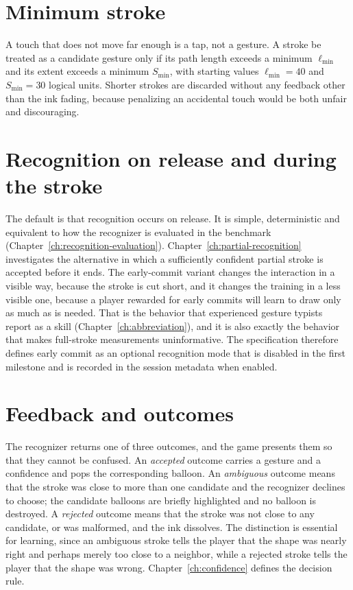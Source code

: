 \section{Minimum stroke}

A touch that does not move far enough is a tap, not a gesture. A stroke \must{} be treated as a candidate gesture only if its path length exceeds a minimum $\ell_{\min}$ and its extent exceeds a minimum $S_{\min}$, with starting values $\ell_{\min}=40$ and $S_{\min}=30$ logical units.\evS{} Shorter strokes are discarded without any feedback other than the ink fading, because penalizing an accidental touch would be both unfair and discouraging.

\section{Recognition on release and during the stroke}

The default is that recognition occurs on release. It is simple, deterministic and equivalent to how the recognizer is evaluated in the benchmark (Chapter~\ref{ch:recognition-evaluation}). Chapter~\ref{ch:partial-recognition} investigates the alternative in which a sufficiently confident partial stroke is accepted before it ends. The early-commit variant changes the interaction in a visible way, because the stroke is cut short, and it changes the training in a less visible one, because a player rewarded for early commits will learn to draw only as much as is needed. That is the behavior that experienced gesture typists report as a skill (Chapter~\ref{ch:abbreviation}), and it is also exactly the behavior that makes full-stroke measurements uninformative. The specification therefore defines early commit as an optional recognition mode that is disabled in the first milestone and is recorded in the session metadata when enabled.

\section{Feedback and outcomes}

The recognizer returns one of three outcomes, and the game presents them so that they cannot be confused. An \emph{accepted} outcome carries a gesture and a confidence and pops the corresponding balloon. An \emph{ambiguous} outcome means that the stroke was close to more than one candidate and the recognizer declines to choose; the candidate balloons are briefly highlighted and no balloon is destroyed. A \emph{rejected} outcome means that the stroke was not close to any candidate, or was malformed, and the ink dissolves. The distinction is essential for learning, since an ambiguous stroke tells the player that the shape was nearly right and perhaps merely too close to a neighbor, while a rejected stroke tells the player that the shape was wrong. Chapter~\ref{ch:confidence} defines the decision rule.

